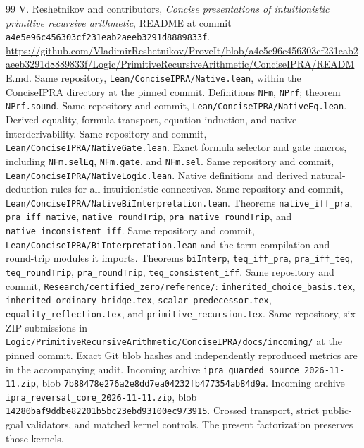 \documentclass[11pt,letterpaper]{article}
\theoremstyle{definition}\newtheorem{definition}[theorem]{Definition}
\theoremstyle{remark}\newtheorem{remark}[theorem]{Remark}
\newcommand{\file}[1]{\texttt{\nolinkurl{#1}}}
\newcommand{\code}[1]{\texttt{#1}}
\begin{document}
\begin{thebibliography}{99}
 V. Reshetnikov and contributors,
\emph{Concise presentations of intuitionistic primitive recursive arithmetic},
README at commit \file{a4e5e96c456303cf231eab2aeeb3291d8889833f}.
\url{https://github.com/VladimirReshetnikov/ProveIt/blob/a4e5e96c456303cf231eab2aeeb3291d8889833f/Logic/PrimitiveRecursiveArithmetic/ConciseIPRA/README.md}.
 Same repository, \file{Lean/ConciseIPRA/Native.lean},
within the ConciseIPRA directory at the pinned commit. Definitions
\code{NFm}, \code{NPrf}; theorem \code{NPrf.sound}.
 Same repository and commit,
\file{Lean/ConciseIPRA/NativeEq.lean}. Derived equality,
formula transport, equation induction, and native interderivability.
 Same repository and commit,
\file{Lean/ConciseIPRA/NativeGate.lean}. Exact formula selector and gate
macros, including \code{NFm.selEq}, \code{NFm.gate}, and \code{NFm.sel}.
 Same repository and commit,
\file{Lean/ConciseIPRA/NativeLogic.lean}. Native definitions and derived
natural-deduction rules for all intuitionistic connectives.
 Same repository and commit,
\file{Lean/ConciseIPRA/NativeBiInterpretation.lean}. Theorems
\code{native\_iff\_pra}, \code{pra\_iff\_native},
\code{native\_roundTrip}, \code{pra\_native\_roundTrip}, and
\code{native\_inconsistent\_iff}.
 Same repository and commit,
\file{Lean/ConciseIPRA/BiInterpretation.lean} and the term-compilation and
round-trip modules it imports. Theorems \code{biInterp},
\code{teq\_iff\_pra}, \code{pra\_iff\_teq},
\code{teq\_roundTrip}, \code{pra\_roundTrip},
\code{teq\_consistent\_iff}.
 Same repository and commit,
\file{Research/certified_zero/reference/}: \file{inherited_choice_basis.tex},
\file{inherited_ordinary_bridge.tex}, \file{scalar_predecessor.tex},
\file{equality_reflection.tex}, and \file{primitive_recursion.tex}.
 Same repository, six ZIP submissions in
\file{Logic/PrimitiveRecursiveArithmetic/ConciseIPRA/docs/incoming/}
at the pinned commit. Exact Git blob hashes and independently reproduced
metrics are in the accompanying audit.
 Incoming archive
\file{ipra_guarded_source_2026-11-11.zip}, blob
\file{7b88478e276a2e8dd7ea04232fb477354ab84d9a}.
 Incoming archive
\file{ipra_reversal_core_2026-11-11.zip}, blob
\file{14280baf9ddbe82201b5bc23ebd93100ec973915}.
Crossed transport, strict public-goal validators, and matched kernel
controls. The present factorization preserves those kernels.
\end{thebibliography}
\end{document}
